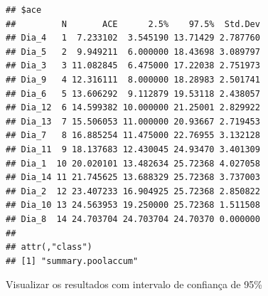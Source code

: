 \documentclass[
]{book}
\begin{document}
\begin{verbatim}
## $ace
##         N       ACE      2.5%    97.5%  Std.Dev
## Dia_4   1  7.233102  3.545190 13.71429 2.787760
## Dia_5   2  9.949211  6.000000 18.43698 3.089797
## Dia_3   3 11.082845  6.475000 17.22038 2.751973
## Dia_9   4 12.316111  8.000000 18.28983 2.501741
## Dia_6   5 13.606292  9.112879 19.53118 2.438057
## Dia_12  6 14.599382 10.000000 21.25001 2.829922
## Dia_13  7 15.506053 11.000000 20.93667 2.719453
## Dia_7   8 16.885254 11.475000 22.76955 3.132128
## Dia_11  9 18.137683 12.430045 24.93470 3.401309
## Dia_1  10 20.020101 13.482634 25.72368 4.027058
## Dia_14 11 21.745625 13.688329 25.72368 3.737003
## Dia_2  12 23.407233 16.904925 25.72368 2.850822
## Dia_10 13 24.563953 19.250000 25.72368 1.511508
## Dia_8  14 24.703704 24.703704 24.70370 0.000000
## 
## attr(,"class")
## [1] "summary.poolaccum"
\end{verbatim}

Visualizar os resultados com intervalo de confiança de 95\%
\end{document}
